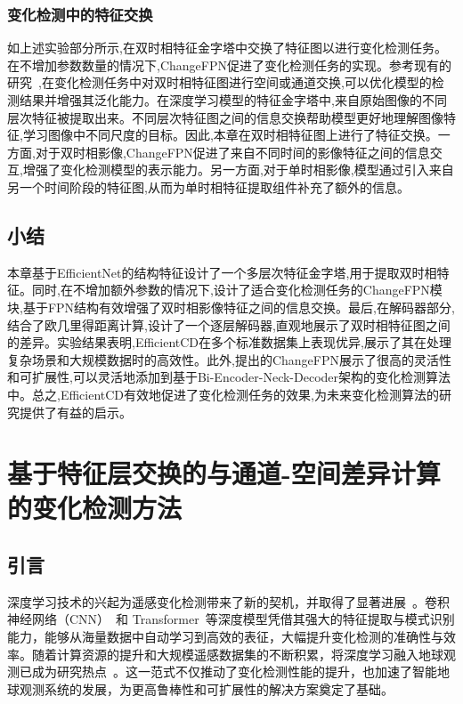 \subsubsection{变化检测中的特征交换}

如上述实验部分所示,在双时相特征金字塔中交换了特征图以进行变化检测任务。在不增加参数数量的情况下,ChangeFPN促进了变化检测任务的实现。参考现有的研究~\cite{Fang2022ChangerFI},在变化检测任务中对双时相特征图进行空间或通道交换,可以优化模型的检测结果并增强其泛化能力。在深度学习模型的特征金字塔中,来自原始图像的不同层次特征被提取出来。不同层次特征图之间的信息交换帮助模型更好地理解图像特征,学习图像中不同尺度的目标。因此,本章在双时相特征图上进行了特征交换。一方面,对于双时相影像,ChangeFPN促进了来自不同时间的影像特征之间的信息交互,增强了变化检测模型的表示能力。另一方面,对于单时相影像,模型通过引入来自另一个时间阶段的特征图,从而为单时相特征提取组件补充了额外的信息。

\subsection{小结}

本章基于EfficientNet的结构特征设计了一个多层次特征金字塔,用于提取双时相特征。同时,在不增加额外参数的情况下,设计了适合变化检测任务的ChangeFPN模块,基于FPN结构有效增强了双时相影像特征之间的信息交换。最后,在解码器部分,结合了欧几里得距离计算,设计了一个逐层解码器,直观地展示了双时相特征图之间的差异。实验结果表明,EfficientCD在多个标准数据集上表现优异,展示了其在处理复杂场景和大规模数据时的高效性。此外,提出的ChangeFPN展示了很高的灵活性和可扩展性,可以灵活地添加到基于Bi-Encoder-Neck-Decoder架构的变化检测算法中。总之,EfficientCD有效地促进了变化检测任务的效果,为未来变化检测算法的研究提供了有益的启示。


\section{基于特征层交换的与通道-空间差异计算的变化检测方法}
\subsection{引言}

深度学习技术的兴起为遥感变化检测带来了新的契机，并取得了显著进展~\cite{ting_bai_deep_2023}。卷积神经网络（CNN）~\cite{He2015DeepRL}和 Transformer~\cite{Vaswani2017AttentionIA}等深度模型凭借其强大的特征提取与模式识别能力，能够从海量数据中自动学习到高效的表征，大幅提升变化检测的准确性与效率。随着计算资源的提升和大规模遥感数据集的不断积累，将深度学习融入地球观测已成为研究热点~\cite{Wang2024HyperSIGMAHI}。这一范式不仅推动了变化检测性能的提升，也加速了智能地球观测系统的发展，为更高鲁棒性和可扩展性的解决方案奠定了基础。

